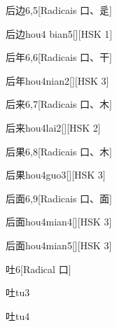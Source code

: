 \begin{entry}{后边}{6,5}[Radicais ⼝、⾡]
  \begin{phonetics}{后边}{hou4 bian5}[][HSK 1]
  \end{phonetics}
\end{entry}

\begin{entry}{后年}{6,6}[Radicais ⼝、⼲]
  \begin{phonetics}{后年}{hou4nian2}[][HSK 3]
  \end{phonetics}
\end{entry}

\begin{entry}{后来}{6,7}[Radicais ⼝、⽊]
  \begin{phonetics}{后来}{hou4lai2}[][HSK 2]
  \end{phonetics}
\end{entry}

\begin{entry}{后果}{6,8}[Radicais ⼝、⽊]
  \begin{phonetics}{后果}{hou4guo3}[][HSK 3]
  \end{phonetics}
\end{entry}

\begin{entry}{后面}{6,9}[Radicais ⼝、⾯]
  \begin{phonetics}{后面}{hou4mian4}[][HSK 3]
  \end{phonetics}
  \begin{phonetics}{后面}{hou4mian5}[][HSK 3]
  \end{phonetics}
\end{entry}

\begin{entry}{吐}{6}[Radical ⼝]
  \begin{phonetics}{吐}{tu3}
  \end{phonetics}
  \begin{phonetics}{吐}{tu4}
  \end{phonetics}
\end{entry}

